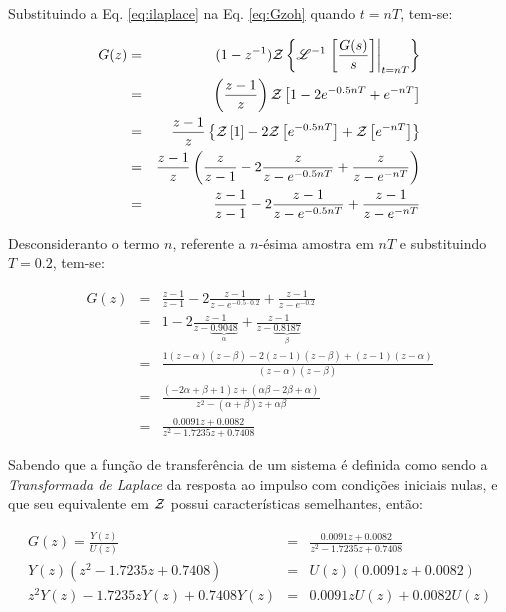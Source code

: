 Substituindo a Eq. \ref{eq:ilaplace} na Eq. \ref{eq:Gzoh} quando $t = nT$,
tem-se:

\begin{eqnarray}
G(z) & = & (1 - z^{-1})
           \mathcal{Z}\left\{\mathscr{L}^{-1}\left.\left[\frac{G(s)}{s}\right]
                                  \right|_{t = nT}\right\}\nonumber\\
& = & \left(\frac{z-1}{z}\right)
      \mathcal{Z}\left[1 - 2e^{-0.5nT} + e^{-nT}\right]\nonumber\\
& = & \frac{z-1}{z}\left\{\mathcal{Z}\left[1\right] - 
                          2\mathcal{Z}\left[e^{-0.5nT}\right] + 
                          \mathcal{Z}\left[e^{-nT}\right]\right\}\nonumber\\
& = & \frac{z-1}{z}\left(\frac{z}{z-1} - 
                           2\frac{z}{z-e^{-0.5nT}} + 
                           \frac{z}{z - e^{-nT}} \right)\nonumber\\
& = & \frac{z-1}{z-1} - 
      2\frac{z-1}{z-e^{-0.5nT}} + 
      \frac{z-1}{z - e^{-nT}}\nonumber\\
\end{eqnarray}

Desconsideranto o termo $n$, referente a $n$-ésima amostra em $nT$ e
substituindo $T = 0.2$, tem-se:

\begin{eqnarray}
G(z) & = & \frac{z-1}{z-1} - 
           2\frac{z-1}{z-e^{-0.5 \cdotp 0.2}} + 
           \frac{z-1}{z-e^{-0.2}}\nonumber\\
& = & 1 - 
      2\frac{z-1}{z-\underbrace{0.9048}_{\alpha}} + 
      \frac{z-1}{z-\underbrace{0.8187}_{\beta}}\nonumber\\
& = & \frac{1(z-\alpha)(z-\beta)-2(z-1)(z-\beta)+(z-1)(z-\alpha)}
           {(z-\alpha)(z-\beta)}\nonumber\\
& = & \frac{(-2\alpha + \beta + 1)z + (\alpha\beta - 2\beta + \alpha)}
           {z^2 - (\alpha+\beta)z + \alpha\beta}\nonumber\\
& = & \frac{0.0091z + 0.0082}{z^2 - 1.7235z + 0.7408}
\end{eqnarray}

Sabendo que a função de transferência de um sistema é definida como sendo a {\it
Transformada de Laplace} da resposta ao impulso com condições iniciais nulas, e
que seu equivalente em $\mathcal{Z}$ possui características semelhantes, então:

\begin{eqnarray}
G(z) = \frac{Y(z)}{U(z)} & = & \frac{0.0091z + 0.0082}
                                    {z^2 - 1.7235z + 0.7408}\nonumber\\
Y(z)(z^2 - 1.7235z + 0.7408) & = & U(z)(0.0091z + 0.0082)\nonumber\\
z^2Y(z) - 1.7235zY(z) + 0.7408Y(z) & = & 0.0091zU(z) +
                                        0.0082U(z)\label{eq:sist_z}
\end{eqnarray}

